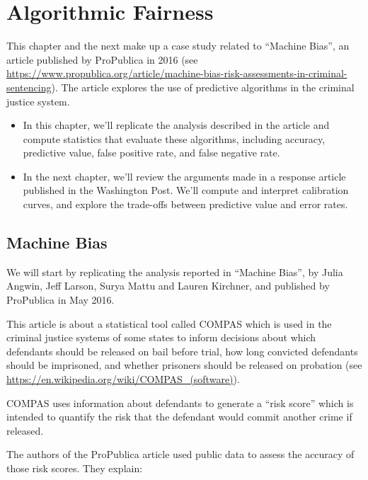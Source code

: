 \hypertarget{algorithmic-fairness}{%
\chapter{Algorithmic Fairness}\label{algorithmic-fairness}}

This chapter and the next make up a case study related to ``Machine
Bias'', an article published by ProPublica in 2016 (see
\url{https://www.propublica.org/article/machine-bias-risk-assessments-in-criminal-sentencing}).
The article explores the use of predictive algorithms in the criminal
justice system.

\begin{itemize}
\item
  In this chapter, we'll replicate the analysis described in the article
  and compute statistics that evaluate these algorithms, including
  accuracy, predictive value, false positive rate, and false negative
  rate.
\item
  In the next chapter, we'll review the arguments made in a response
  article published in the Washington Post. We'll compute and interpret
  calibration curves, and explore the trade-offs between predictive
  value and error rates.
\end{itemize}

\hypertarget{machine-bias}{%
\section{Machine Bias}\label{machine-bias}}

We will start by replicating the analysis reported in ``Machine Bias'',
by Julia Angwin, Jeff Larson, Surya Mattu and Lauren Kirchner, and
published by ProPublica in May 2016.

This article is about a statistical tool called COMPAS which is used in
the criminal justice systems of some states to inform decisions about
which defendants should be released on bail before trial, how long
convicted defendants should be imprisoned, and whether prisoners should
be released on probation (see
\url{https://en.wikipedia.org/wiki/COMPAS_(software)}).

COMPAS uses information about defendants to generate a ``risk score''
which is intended to quantify the risk that the defendant would commit
another crime if released.

The authors of the ProPublica article used public data to assess the
accuracy of those risk scores. They explain:

